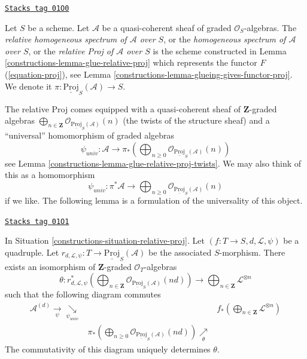 \begin{definition}
\label{constructions-definition-relative-proj}
\href{https://stacks.math.columbia.edu/tag/01O0}{\texttt{Stacks tag 01O0}}

Let $S$ be a scheme. Let $\mathcal{A}$ be a quasi-coherent sheaf of
graded $\mathcal{O}_S$-algebras. The
{\it relative homogeneous spectrum of $\mathcal{A}$ over $S$},
or the {\it homogeneous spectrum of $\mathcal{A}$ over $S$}, or the
{\it relative Proj of $\mathcal{A}$ over $S$} is the scheme
constructed in Lemma \ref{constructions-lemma-glue-relative-proj} which represents the
functor $F$ (\ref{equation-proj}), see
Lemma \ref{constructions-lemma-glueing-gives-functor-proj}.
We denote it $\pi : \underline{\text{Proj}}_S(\mathcal{A}) \to S$.
\end{definition}

The relative Proj comes equipped with a quasi-coherent
sheaf of $\mathbf{Z}$-graded algebras
$\bigoplus_{n \in \mathbf{Z}}
\mathcal{O}_{\underline{\text{Proj}}_S(\mathcal{A})}(n)$
(the twists of the structure sheaf) and
a ``universal'' homomorphism of graded algebras
$$
\psi_{univ} :
\mathcal{A}
\longrightarrow
\pi_*\left(
\bigoplus\nolimits_{n \geq 0}
\mathcal{O}_{\underline{\text{Proj}}_S(\mathcal{A})}(n)
\right)
$$
see Lemma \ref{constructions-lemma-glue-relative-proj-twists}. We may also think of this
as a homomorphism
$$
\psi_{univ} :
\pi^*\mathcal{A}
\longrightarrow
\bigoplus\nolimits_{n \geq 0}
\mathcal{O}_{\underline{\text{Proj}}_S(\mathcal{A})}(n)
$$
if we like. The following lemma is a formulation of the
universality of this object.

\begin{lemma}
\label{constructions-lemma-tie-up-psi}
\href{https://stacks.math.columbia.edu/tag/01O1}{\texttt{Stacks tag 01O1}}

In Situation \ref{constructions-situation-relative-proj}.
Let $(f : T \to S, d, \mathcal{L}, \psi)$
be a quadruple. Let
$r_{d, \mathcal{L}, \psi} : T \to \underline{\text{Proj}}_S(\mathcal{A})$
be the associated $S$-morphism.
There exists an isomorphism
of $\mathbf{Z}$-graded $\mathcal{O}_T$-algebras
$$
\theta :
r_{d, \mathcal{L}, \psi}^*\left(
\bigoplus\nolimits_{n \in \mathbf{Z}}
\mathcal{O}_{\underline{\text{Proj}}_S(\mathcal{A})}(nd)
\right)
\longrightarrow
\bigoplus\nolimits_{n \in \mathbf{Z}} \mathcal{L}^{\otimes n}
$$
such that the following diagram commutes
$$
\begin{array}{ccc}\mathcal{A}^{(d)} \underset{\psi}{\longrightarrow}\underset{\psi_{univ}}{\searrow} &  & f_*\left(
\bigoplus\nolimits_{n \in \mathbf{Z}}
\mathcal{L}^{\otimes n}
\right) \\  & \pi_*\left(
\bigoplus\nolimits_{n \geq 0}
\mathcal{O}_{\underline{\text{Proj}}_S(\mathcal{A})}(nd)
\right) \underset{\theta}{\nearrow} & \end{array}
$$
The commutativity of this diagram uniquely determines $\theta$.
\end{lemma}

